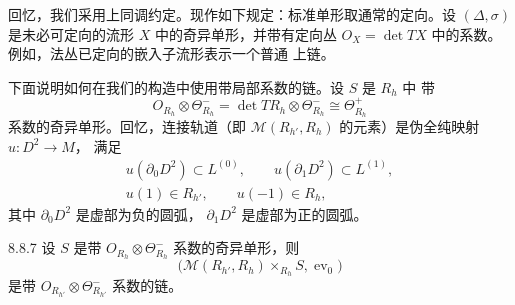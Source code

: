 回忆，我们采用上同调约定。现作如下规定：标准单形取通常的定向。设
$(\Delta,\sigma)$ 是未必可定向的流形 $X$ 中的奇异单形，并带有定向丛
$O_X=\det TX$ 中的系数。例如，法丛已定向的嵌入子流形表示一个普通
上链。

下面说明如何在我们的构造中使用带局部系数的链。设 $S$ 是 $R_h$ 中
带
\[
 O_{R_h}\otimes\Theta^-_{R_h}
 =\det TR_h\otimes\Theta^-_{R_h}
 \cong\Theta^+_{R_h}
\]
系数的奇异单形。回忆，连接轨道（即
$\mathcal M(R_{h'},R_h)$ 的元素）是伪全纯映射 $u\colon D^2\to M$，
满足
\[
\begin{gathered}
 u(\partial_0D^2)\subset L^{(0)},\qquad
 u(\partial_1D^2)\subset L^{(1)},\\
 u(1)\in R_{h'},\qquad u(-1)\in R_h,
\end{gathered}
\]
其中 $\partial_0D^2$ 是虚部为负的圆弧，
$\partial_1D^2$ 是虚部为正的圆弧。

\begin{proposition}{8.8.7}\label{prop:8-8-7}
设 $S$ 是带 $O_{R_h}\otimes\Theta^-_{R_h}$ 系数的奇异单形，则
\[
 \bigl(\mathcal M(R_{h'},R_h)\times_{R_h}S,\operatorname{ev}_0\bigr)
\]
是带 $O_{R_{h'}}\otimes\Theta^-_{R_{h'}}$ 系数的链。
\end{proposition}

